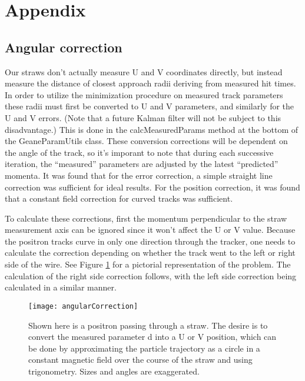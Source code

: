 \appendix
\newpage
\section{Appendix}
\label{sec:Appendix}

  \subsection{Angular correction}

  Our straws don't actually measure U and V coordinates directly, but instead measure the distance of closest approach radii deriving from measured hit times. In order to utilize the minimization procedure on measured track parameters these radii must first be converted to U and V parameters, and similarly for the U and V errors. (Note that a future Kalman filter will not be subject to this disadvantage.) This is done in the calcMeasuredParams method at the bottom of the GeaneParamUtils class. These conversion corrections will be dependent on the angle of the track, so it's imporant to note that during each successive iteration, the ``measured'' parameters are adjusted by the latest ``predicted'' momenta. It was found that for the error correction, a simple straight line correction was sufficient for ideal results. For the position correction, it was found that a constant field correction for curved tracks was sufficient.

  To calculate these corrections, first the momentum perpendicular to the straw measurement axis can be ignored since it won't affect the U or V value. Because the positron tracks curve in only one direction through the tracker, one needs to calculate the correction depending on whether the track went to the left or right side of the wire. See Figure \ref{fig:angularCorrection} for a pictorial representation of the problem. The calculation of the right side correction follows, with the left side correction being calculated in a similar manner.

	\begin{figure}[]
	\caption{Shown here is a positron passing through a straw. The desire is to convert the measured parameter d into a U or V position, which can be done by approximating the particle trajectory as a circle in a constant magnetic field over the course of the straw and using trigonometry. Sizes and angles are exaggerated.}
	\centering
	\texttt{[image: angularCorrection]}
	\label{fig:angularCorrection}
	\end{figure}

